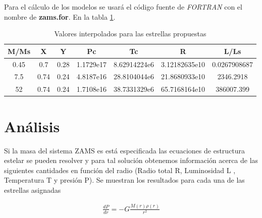 \documentclass[12pt]{article}
\begin{document}
Para el cálculo de los modelos se usará el código fuente de \textit{FORTRAN} con el nombre de \textbf{zams.for}. En la tabla \ref{tab:data}.

\begin{table}[H]
\centering
\begin{tabular}{|c|c|c|c|c|c|c|}
\hline  
M/Ms   & X    & Y    & Pc        & Tc           & R               & L/Ls           \\ \hline
0.45   & 0.7  & 0.28 & 1.1729e17 & 8.62914224e6 & 3.12182635e10   & 0.0267908687   \\ \hline
7.5    & 0.74 & 0.24 & 4.8187e16 & 28.8104044e6 & 21.8680933e10   & 2346.2918      \\ \hline
52     & 0.74 & 0.24 & 1.7108e16 & 38.7331329e6 & 65.7168164e10   & 386007.399     \\ \hline
\end{tabular}
\caption{Valores interpolados para las estrellas propuestas}
\label{tab:data}
\end{table}


\section{Análisis}

Si la masa del sistema ZAMS es está especificada las ecuaciones de estructura estelar se pueden resolver y para tal solución obtenemos información acerca de las siguientes cantidades en función del radio (Radio total R, Luminosidad L , Temperatura T  y presión P). Se muestran los resultados para cada una de las estrellas asignadas



\begin{eqnarray}
	\frac{dP}{dr} = -G\frac{M(r)\rho(r)}{r^2}
\end{eqnarray}
\end{document}
